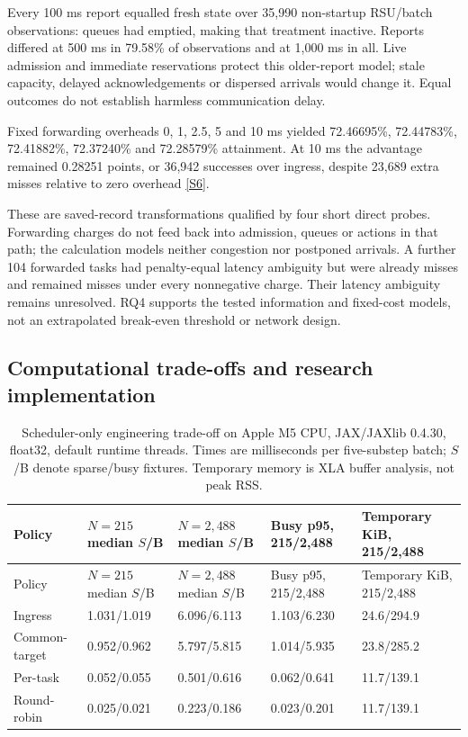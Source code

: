 \documentclass[11pt,a4paper]{article}
\begin{document}
Every 100 ms report equalled fresh state over 35,990 non-startup RSU/batch observations: queues had emptied, making that treatment inactive. Reports differed at 500 ms in 79.58\% of observations and at 1,000 ms in all. Live admission and immediate reservations protect this older-report model; stale capacity, delayed acknowledgements or dispersed arrivals would change it. Equal outcomes do not establish harmless communication delay.

Fixed forwarding overheads 0, 1, 2.5, 5 and 10 ms yielded 72.46695\%, 72.44783\%, 72.41882\%, 72.37240\% and 72.28579\% attainment. At 10 ms the advantage remained 0.28251 points, or 36,942 successes over ingress, despite 23,689 extra misses relative to zero overhead \hyperref[source-s6]{[S6]}.

These are saved-record transformations qualified by four short direct probes. Forwarding charges do not feed back into admission, queues or actions in that path; the calculation models neither congestion nor postponed arrivals. A further 104 forwarded tasks had penalty-equal latency ambiguity but were already misses and remained misses under every nonnegative charge. Their latency ambiguity remains unresolved. RQ4 supports the tested information and fixed-cost models, not an extrapolated break-even threshold or network design.

\subsection{Computational trade-offs and research implementation}\label{sec:3.7}

\begingroup
\small
\begin{xltabular}{\textwidth}{@{}YYYYY@{}}
\caption{Scheduler-only engineering trade-off on Apple M5 CPU, JAX/JAXlib 0.4.30, float32, default runtime threads. Times are milliseconds per five-substep batch; $S$/B denote sparse/busy fixtures. Temporary memory is XLA buffer analysis, not peak RSS.}\label{tab:10} \\
\toprule
Policy & $N=215$ median $S$/B & $N=2{,}488$ median $S$/B & Busy p95, 215/2,488 & Temporary KiB, 215/2,488 \\
\midrule\endfirsthead
\toprule
Policy & $N=215$ median $S$/B & $N=2{,}488$ median $S$/B & Busy p95, 215/2,488 & Temporary KiB, 215/2,488 \\
\midrule\endhead
\bottomrule\endfoot
Ingress & 1.031/1.019 & 6.096/6.113 & 1.103/6.230 & 24.6/294.9 \\
Common-target & 0.952/0.962 & 5.797/5.815 & 1.014/5.935 & 23.8/285.2 \\
Per-task & 0.052/0.055 & 0.501/0.616 & 0.062/0.641 & 11.7/139.1 \\
Round-robin & 0.025/0.021 & 0.223/0.186 & 0.023/0.201 & 11.7/139.1 \\
\end{xltabular}
\endgroup
\end{document}
